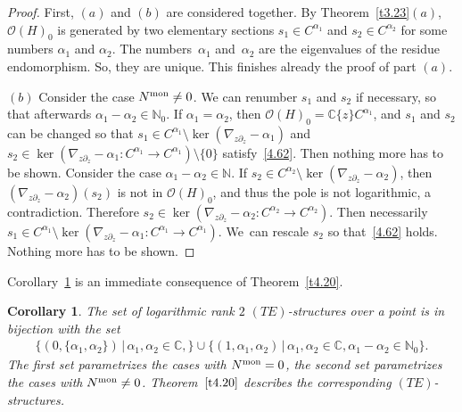 \documentclass[10pt,a4paper]{amsart}
\numberwithin{equation}{section}
\numberwithin{figure}{section}
\newcommand{\N}{{\mathbb N}}
\newcommand{\C}{{\mathbb C}}
\newcommand{\OO}{{\mathcal O}}
\newcommand{\paa}{\partial}
\newcommand{\nnn}{\nabla}
\newtheorem{Corollary}[Theorem]{Corollary}
\begin{document}
\begin{proof}
First, $(a)$ and $(b)$ are considered together.
By Theorem~\ref{t3.23}$(a)$, $\OO(H)_0$ is
generated by two elementary sections
$s_1\in C^{\alpha_1}$ and $s_2\in C^{\alpha_2}$
for some numbers $\alpha_1$ and $\alpha_2$.
The numbers~$\alpha_1$ and~$\alpha_2$ are the
eigenvalues of the residue endomorphism.
So, they are unique.
This finishes already the proof of part $(a)$.

$(b)$ Consider the case $N^{\rm mon}\neq 0$.
We can renumber $s_1$ and $s_2$ if necessary, so that
afterwards $\alpha_1-\alpha_2\in\N_0$.
If $\alpha_1=\alpha_2$, then $\OO(H)_0=\C\{z\}C^{\alpha_1}$,
and $s_1$ and $s_2$ can be changed so that
$s_1\in C^{\alpha_1}\setminus \ker(\nnn_{z\paa_z}-\alpha_1)$
and $s_2\in \ker(\nnn_{z\paa_z}-\alpha_1\colon
C^{\alpha_1}\to C^{\alpha_1})\setminus\{0\}$ satisfy~\eqref{4.62}.
Then nothing more has to be shown.
Consider the case $\alpha_1-\alpha_2\in\N$.
If $s_2\in C^{\alpha_2}\setminus \ker(\nnn_{z\paa_z}-\alpha_2)$,
then $(\nnn_{z\paa_z}-\alpha_2)(s_2)$ is not in
$\OO(H)_0$, and thus the pole is not logarithmic,
a contradiction. Therefore
$s_2\in \ker(\nnn_{z\paa_z}-\alpha_2\colon
C^{\alpha_2}\to C^{\alpha_2})$. Then necessarily
$s_1\in C^{\alpha_1}\setminus \ker(\nnn_{z\paa_z}-\alpha_1\colon
C^{\alpha_1} \to C^{\alpha_1})$.
We~can rescale $s_2$ so that~\eqref{4.62} holds.
Nothing more has to be shown.
\end{proof}

Corollary~\ref{t4.21} is an immediate consequence of
Theorem~\ref{t4.20}.

\begin{Corollary}\label{t4.21}
The set of logarithmic rank $2$ $(TE)$-structures over a point
is in bijection with the set
\begin{gather*}
\{(0,\{\alpha_1,\alpha_2\})\,|\, \alpha_1,\alpha_2\in\C,\}
\cup\{(1,\alpha_1,\alpha_2)\,|\, \alpha_1,\alpha_2\in\C,\alpha_1-\alpha_2\in \N_0\}.
\end{gather*}
The first set parametrizes the cases with $N^{\rm mon}=0$,
the second set parametrizes the cases with $N^{\rm mon}\neq 0$.
Theorem~$\ref{t4.20}$ describes the corresponding
$(TE)$-structures.
\end{Corollary}
\end{document}

